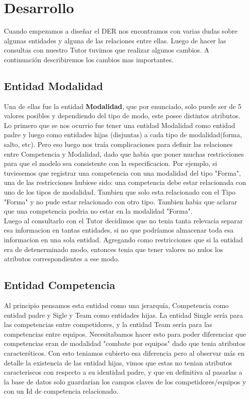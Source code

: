 \section{Desarrollo}

Cuando empezamos a diseñar el DER nos encontramos con varias dudas sobre algunas entidades y alguna de las
relaciones entre ellas. Luego de hacer las consultas con nuestro Tutor tuvimos que realizar algunos cambios. A continuaci\'on describiremos los cambios mas  importantes.

\subsection{Entidad Modalidad}


Una de ellas fue la entidad \textbf{Modalidad}, que por enunciado, solo puede ser de 5 valores posibles y dependiendo del tipo de modo, este posee distintos atributos. Lo primero que se nos ocurrio fue tener una entidad Modalidad como entidad padre y luego como entidades hijas (disjuntas) a cada tipo de modalidad(forma, salto, etc).
Pero eso luego nos tra\'ia complicaciones para definir las relaciones entre Competencia y Modalidad, dado que habia que poner muchas restricciones para que el modelo sea consistente con la especificacion. 
Por ejemplo, si tuviesemos que registrar una competencia con una modalidad del tipo "Forma", una de las restricciones hubiese sido: una competencia debe estar relacionada con uno de los tipos de modalidad. Tambien que solo esta relacionado con el Tipo "Forma" y no pude estar relacionado con otro tipo. 
Tambien habia que aclarar que una competencia podria no estar en la modalidad "Forma". \\

Luego al consultarlo con el Tutor decidimos que no tenia tanta relevacia separar esa informacion en tantas entidades, si no que podr\'iamos almacenar toda esa informacion en una sola entidad. Agregando como restricciones que si la entidad era de detenerminado modo, entonces tenia que tener valores no nulos los atributos correspondientes a ese modo. \\

\subsection{Entidad Competencia}


Al principio pensamos esta entidad como una jerarqu\'ia, Competencia como entidad padre y Sigle y Team como entidades hijas. La entidad Single ser\'ia para las competencias entre competidores, y la entidad Team ser\'ia para las competencias entre equipos. Necesitabamos hacer esto para poder diferenciar que competencias eran de modalidad "combate por equipos" dado que tenia atributos caracter\'sticos. Con esto teniamos cubierto esa diferencia pero al observar m\'as en detalle la existencia de las entidad hijas, vimos que estas no tenian atributos caracteriscos con respecto a su identidad padre, y que en definitiva al pasarlas a la base de datos solo guardar\'ian los campos claves de los competidores/equipos y con un Id de competencia relacionado.\\

